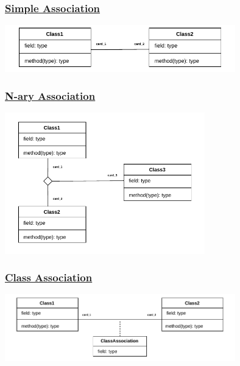\subsubsection*{\underline{Simple Association}}

\begin{center}
   \includegraphics[width=0.75\textwidth]{Chapters/Diagram/OOP/Sum/SAssoc/simpleassoc.drawio.pdf}
\end{center}

\subsubsection*{\underline{N-ary Association}}

\begin{center}
\includegraphics[width=0.65\textwidth]{Chapters/Diagram/OOP/Sum/NaryAssoc/naryassoc.drawio.pdf}
\end{center}

\subsubsection*{\underline{Class Association}}

\begin{center}
\includegraphics[width=0.75\textwidth]{Chapters/Diagram/OOP/Sum/Class Association/classassoc.drawio.pdf}
\end{center}

